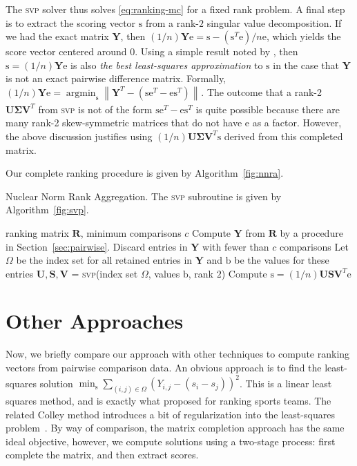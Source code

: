 \documentclass{sig-alternate}
\renewcommand{\cite}{\citep}
\newcommand{\algo}[1]{\textsc{\lowercase{#1}}}
\newcommand{\mat}{\boldsymbol}
\renewcommand{\vec}[1]{\boldsymbol{\mathrm{#1}}}
\providecommand{\mSigma}{\ensuremath{\mat{\Sigma}}}
\providecommand{\mR}{\ensuremath{\mat{R}}}
\providecommand{\mS}{\ensuremath{\mat{S}}}
\providecommand{\mU}{\ensuremath{\mat{U}}}
\providecommand{\mV}{\ensuremath{\mat{V}}}
\providecommand{\mY}{\ensuremath{\mat{Y}}}
\providecommand{\vb}{\ensuremath{\vec{b}}}
\providecommand{\ve}{\ensuremath{\vec{e}}}
\providecommand{\vs}{\ensuremath{\vec{s}}}
\newcommand{\sstretchsym}[3]{\ensuremath{\left#1 #3 \right#2}}
\newcommand{\normof}[2][]{\sstretchsym{\|}{\|}{#2}_{#1}}
\begin{document}
The \algo{svp} solver thus solves \eqref{eq:ranking-mc} for a fixed
rank problem.
A final step is to extract the scoring vector $\vs$ from a rank-$2$ singular
value decomposition.  If we had the exact matrix $\mY$, then
$(1/n) \mY \ve = \vs - (\vs^T \ve)/n \ve$, which yields
the score vector centered around 0.  Using a simple 
result noted by \citet{Meyer2010-Spread}, then
$\vs = (1/n) \mY \ve$
is also \emph{the best least-squares approximation} to $\vs$
in the case that $\mY$ is not an exact pairwise difference
matrix.  Formally, 
$(1/n) \mY \ve = 
\mathop{\mathrm{argmin}}_{\vs} 
\normof{ \mY^T - (\vs \ve^T - \ve \vs^T)}$.
The outcome that a rank-2 $\mU \mSigma \mV^T$ from
\algo{svp} is not of
the form $\vs \ve^T - \ve \vs^T$
 is quite possible because there are many
rank-2 skew-symmetric matrices that do not have $\ve$ 
as a factor.  However, the above discussion
justifies using $(1/n) \mU \mSigma \mV^T \vs$ 
derived from this
completed matrix.

Our complete ranking procedure is given by Algorithm~\ref{fig:nnra}.

\begin{algorithm}[t]
 \caption{Nuclear Norm Rank Aggregation. The \algo{svp}
 subroutine is given by Algorithm~\ref{fig:svp}.}
 \label{fig:nnra}
 \begin{algorithmic}[1]
   \REQUIRE ranking matrix $\mR$, minimum comparisons $c$
   \STATE Compute $\mY$ from $\mR$ by a
     procedure in Section~\ref{sec:pairwise}.
   \STATE Discard entries in $\mY$ with fewer than $c$ comparisons
   \STATE Let $\Omega$ be the index set for all retained entries in $\mY$ and 
      $\vb$ be the values for these entries
   \STATE $\mU,\mS,\mV$ = \algo{svp}(index set $\Omega$, values $\vb$, rank $2$)
   \STATE Compute $\vs = (1/n) \mU \mS \mV^T \ve$
 \end{algorithmic}
\end{algorithm}


\section{Other Approaches}

Now, we briefly compare our approach with other techniques to compute
ranking vectors from pairwise comparison data.  
An obvious approach is to find the least-squares solution 
$\min_{\vs} \sum_{(i,j) \in \Omega} (Y_{i,j} - (s_i - s_j))^2$.
This is a linear least squares method, and is exactly
what \citet{Massey-1997-Sports} proposed for ranking sports teams.
The related Colley method introduces a bit of regularization
into the least-squares problem~\cite{Colley-2002-bias}.
By way of comparison, the matrix completion approach has the
same ideal objective, however, we compute solutions using
a two-stage process: first complete the matrix, and then
extract scores.
\end{document}
